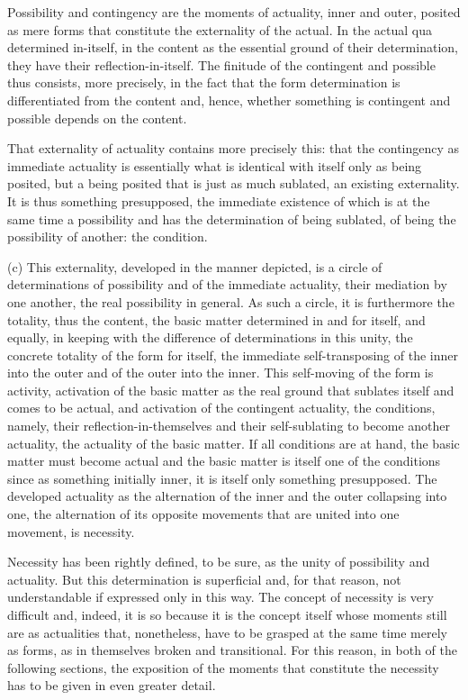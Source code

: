 Possibility and contingency are the moments of actuality, inner and outer,
posited as mere forms that constitute the externality of the actual.
In the actual qua determined in-itself,
in the content as the essential ground of their determination,
they have their reflection-in-itself.
The finitude of the contingent and possible thus consists,
more precisely, in the fact that the form determination is
differentiated from the content and, hence,
whether something is contingent and possible depends on the content.

That externality of actuality contains more precisely this:
that the contingency as immediate actuality is
essentially what is identical with itself only as being posited,
but a being posited that is just as much sublated,
an existing externality.
It is thus something presupposed,
the immediate existence of which
is at the same time a possibility
and has the determination of being sublated,
of being the possibility of another: the condition.

(c) This externality, developed in the manner depicted,
is a circle of determinations of possibility
and of the immediate actuality,
their mediation by one another,
the real possibility in general.
As such a circle, it is furthermore
the totality, thus the content,
the basic matter determined in and for itself,
and equally, in keeping with the
difference of determinations in this unity,
the concrete totality of the form for itself,
the immediate self-transposing of
the inner into the outer
and of the outer into the inner.
This self-moving of the form is activity,
activation of the basic matter as the real ground
that sublates itself and comes to be actual,
and activation of the contingent actuality, the conditions,
namely, their reflection-in-themselves and their self-sublating
to become another actuality,  the actuality of the basic matter.
If all conditions are at hand, the basic matter must become actual
and the basic matter is itself one of the conditions
since as something initially inner,
it is itself only something presupposed.
The developed actuality as the alternation
of the inner and the outer collapsing into one,
the alternation of its opposite movements
that are united into one movement, is necessity.

Necessity has been rightly defined, to be sure,
as the unity of possibility and actuality.
But this determination is superficial
and, for that reason, not understandable
if expressed only in this way.
The concept of necessity is very difficult
and, indeed, it is so because it is the concept itself
whose moments still are as actualities that,
nonetheless, have to be grasped at the same time merely as forms,
as in themselves broken and transitional.
For this reason, in both of the following sections,
the exposition of the moments that
constitute the necessity has to be given
in even greater detail.

